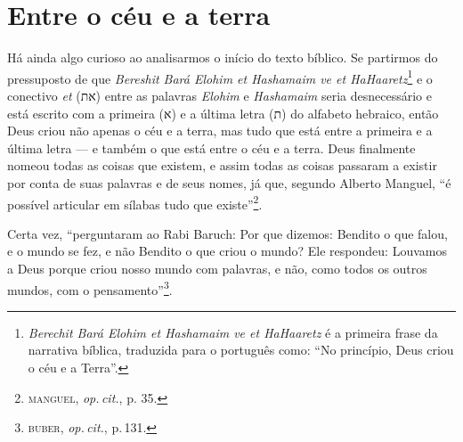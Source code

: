 \section{Entre o céu e a terra}

Há ainda algo curioso ao analisarmos o início do texto bíblico. Se partirmos
do pressuposto de que \emph{Bereshit Bará Elohim et Hashamaim ve et
HaHaaretz}\footnote{\emph{Berechit Bará Elohim et Hashamaim ve et
  HaHaaretz} é a primeira frase da narrativa bíblica, traduzida para o
  português como: ``No princípio, Deus criou o céu e a Terra''.} e o
conectivo \emph{et} ({את}) entre as palavras \emph{Elohim} e
\emph{Hashamaim} seria desnecessário e está escrito com a primeira
({א}) e a última letra ({ת}) do alfabeto hebraico, então Deus
criou não apenas o céu e a terra, mas tudo que está entre a primeira e a última letra --- e também o que está entre o céu e a terra. Deus finalmente nomeou todas as coisas que existem, e
assim todas as coisas passaram a existir por conta de suas palavras e de
seus nomes, já que, segundo Alberto Manguel, ``é possível
articular em sílabas tudo que existe''\footnote{\textsc{manguel}, \emph{op.\,cit.}, p.
  35.}.


\begin{center}\end{center}


\noindent{}Certa vez, ``perguntaram ao Rabi Baruch: Por que dizemos: Bendito
o que falou, e o mundo se fez, e não Bendito o que criou o mundo? Ele
respondeu: Louvamos a Deus porque criou nosso mundo com palavras, e
não, como todos os outros mundos, com o pensamento''\footnote{\textsc{buber},
  \emph{op.\,cit.}, p.\,131.}.

\begin{center}\end{center}


